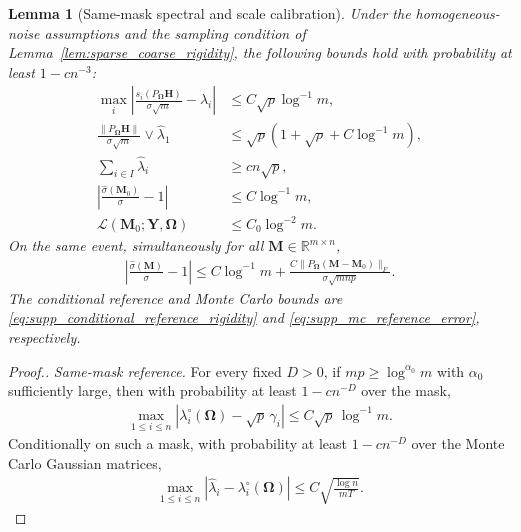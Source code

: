 \documentclass[numsec,webpdf,modern,large,namedate]{oup-authoring-template}
\theoremstyle{plain}
\newtheorem{slemma}{Lemma}%
\theoremstyle{remark}
\newcommand{\M}{\bm{M}}
\newcommand{\bH}{\bm{H}}
\newcommand{\Y}{\bm{Y}}
\newcommand{\bOmega}{\bm{\Omega}}
\newif\ifmarkchanges
\newenvironment{revision}{\begingroup\ifmarkchanges\color{red}\fi}{\endgroup}
\begin{document}
\begin{revision}
\begin{slemma}[Same-mask spectral and scale calibration]
\label{lem:loss_for_true}
Under the homogeneous-noise assumptions and the sampling condition of
Lemma~\ref{lem:sparse_coarse_rigidity}, the following bounds hold with
probability at least $1-cn^{-3}$:
\begin{align}
 \max_i\left|\frac{s_i(P_{\bOmega}\bH)}{\sigma\sqrt m}
                  -\widehat\lambda_i\right|
 &\le C\sqrt p\log^{-1}m,\label{eq:supp_noise_reference_uniform}\\
 \frac{\|P_{\bOmega}\bH\|}{\sigma\sqrt m}
       \vee\widehat\lambda_1
 &\le\sqrt p(1+\sqrt\rho+C\log^{-1}m),
       \label{eq:control_theta_1}\\
 \sum_{i\in I}\widehat\lambda_i&\ge cn\sqrt p,
       \label{eq:bound_for_lambda_sum}\\
 \left|\frac{\widehat\sigma(\M_0)}{\sigma}-1\right|
 &\le C\log^{-1}m,\label{eq:supp_sigma_consistency}\\
 \mathcal L(\M_0;\Y,\bOmega)&\le C_0\log^{-2}m.
       \label{eq:calibration_true_loss}
\end{align}
On the same event, simultaneously for all $\M\in\mathbb R^{m\times n}$,
\begin{align}
 \left|\frac{\widehat\sigma(\M)}{\sigma}-1\right|
 \le C\log^{-1}m+
 \frac{C\|P_{\bOmega}(\M-\M_0)\|_F}{\sigma\sqrt{mnp}}.
 \label{eq:working_scale_bound}
\end{align}
The conditional reference and Monte Carlo bounds are
\eqref{eq:supp_conditional_reference_rigidity} and
\eqref{eq:supp_mc_reference_error}, respectively.
\end{slemma}
\begin{proof}[Proof.]
\textit{Same-mask reference.} For every fixed $D>0$, if $mp\ge\log^{\alpha_0}m$ with $\alpha_0$
sufficiently large, then with probability at least $1-cn^{-D}$ over the
mask,
\begin{align}
\label{eq:supp_conditional_reference_rigidity}
    \max_{1\le i\le n}
    |\lambda_i^{\circ}(\bOmega)-\sqrt p\,\gamma_i|
    \le C\sqrt p\,\log^{-1}m.
\end{align}
Conditionally on such a mask, with probability at least $1-cn^{-D}$ over the
Monte Carlo Gaussian matrices,
\begin{align}
\label{eq:supp_mc_reference_error}
    \max_{1\le i\le n}
    |\widehat\lambda_i-\lambda_i^{\circ}(\bOmega)|
    \le C\sqrt{\frac{\log n}{mT}}.
\end{align}


\end{proof}
\end{revision}
\end{document}
